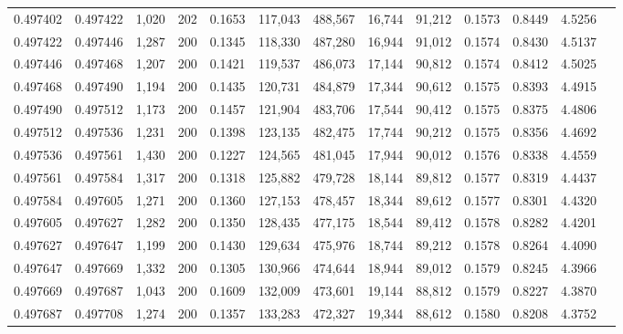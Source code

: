 \begin{tabular}{rrrrrrrrrrrrr}
0.497402 & 0.497422 & 1,020 & 202 &                                     0.1653 & 117,043 & 488,567 &  16,744 &  91,212 & 0.1573 & 0.8449 & 4.5256 \\
0.497422 & 0.497446 & 1,287 & 200 &                                     0.1345 & 118,330 & 487,280 &  16,944 &  91,012 & 0.1574 & 0.8430 & 4.5137 \\
0.497446 & 0.497468 & 1,207 & 200 &                                     0.1421 & 119,537 & 486,073 &  17,144 &  90,812 & 0.1574 & 0.8412 & 4.5025 \\
0.497468 & 0.497490 & 1,194 & 200 &                                     0.1435 & 120,731 & 484,879 &  17,344 &  90,612 & 0.1575 & 0.8393 & 4.4915 \\
0.497490 & 0.497512 & 1,173 & 200 &                                     0.1457 & 121,904 & 483,706 &  17,544 &  90,412 & 0.1575 & 0.8375 & 4.4806 \\
0.497512 & 0.497536 & 1,231 & 200 &                                     0.1398 & 123,135 & 482,475 &  17,744 &  90,212 & 0.1575 & 0.8356 & 4.4692 \\
0.497536 & 0.497561 & 1,430 & 200 &                                     0.1227 & 124,565 & 481,045 &  17,944 &  90,012 & 0.1576 & 0.8338 & 4.4559 \\
0.497561 & 0.497584 & 1,317 & 200 &                                     0.1318 & 125,882 & 479,728 &  18,144 &  89,812 & 0.1577 & 0.8319 & 4.4437 \\
0.497584 & 0.497605 & 1,271 & 200 &                                     0.1360 & 127,153 & 478,457 &  18,344 &  89,612 & 0.1577 & 0.8301 & 4.4320 \\
0.497605 & 0.497627 & 1,282 & 200 &                                     0.1350 & 128,435 & 477,175 &  18,544 &  89,412 & 0.1578 & 0.8282 & 4.4201 \\
0.497627 & 0.497647 & 1,199 & 200 &                                     0.1430 & 129,634 & 475,976 &  18,744 &  89,212 & 0.1578 & 0.8264 & 4.4090 \\
0.497647 & 0.497669 & 1,332 & 200 &                                     0.1305 & 130,966 & 474,644 &  18,944 &  89,012 & 0.1579 & 0.8245 & 4.3966 \\
0.497669 & 0.497687 & 1,043 & 200 &                                     0.1609 & 132,009 & 473,601 &  19,144 &  88,812 & 0.1579 & 0.8227 & 4.3870 \\
0.497687 & 0.497708 & 1,274 & 200 &                                     0.1357 & 133,283 & 472,327 &  19,344 &  88,612 & 0.1580 & 0.8208 & 4.3752 \\

\end{tabular}
